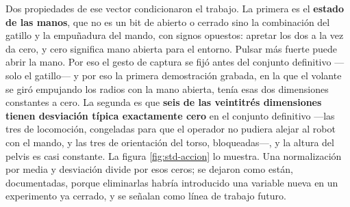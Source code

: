 \begin{table}[!htbp]
	\centering
	\caption{Composición del espacio de acción de veintitrés dimensiones}
	\label{tab:accion}
\end{table}

Dos propiedades de ese vector condicionaron el trabajo. La primera es el \textbf{estado de las
manos}, que no es un bit de abierto o cerrado sino la combinación del gatillo y la empuñadura del
mando, con signos opuestos: apretar los dos a la vez da cero, y cero significa mano abierta para el
entorno. Pulsar más fuerte puede abrir la mano. Por eso el gesto de captura se fijó antes del
conjunto definitivo —solo el gatillo— y por eso la primera demostración grabada, en la que el
volante se giró empujando los radios con la mano abierta, tenía esas dos dimensiones constantes a
cero. La segunda es que \textbf{seis de las veintitrés dimensiones tienen desviación típica
exactamente cero} en el conjunto definitivo —las tres de locomoción, congeladas para que el operador
no pudiera alejar al robot con el mando, y las tres de orientación del torso, bloqueadas—, y la
altura del pelvis es casi constante. La figura \ref{fig:std-accion} lo muestra. Una normalización
por media y desviación divide por esos ceros; se dejaron como están, documentadas, porque
eliminarlas habría introducido una variable nueva en un experimento ya cerrado, y se señalan como
línea de trabajo futuro.

